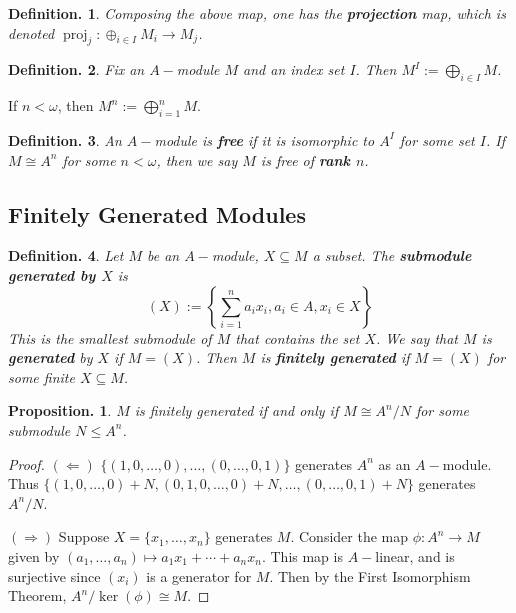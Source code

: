\documentclass[11pt, a4paper]{memoir}
\theoremstyle{change}
\newtheorem{proposition}[theorem]{Proposition.}
\theoremstyle{plain}
\theoremstyle{nonumberplain}
\newtheorem{definition}{Definition.}
\newtheorem{proof}{Proof}
\DeclareMathOperator{\proj}{proj}
\numberwithin{equation}{section}
\begin{document}
\begin{definition}
    Composing the above map, one has the \textbf{projection} map, which is denoted $\proj_j:\oplus_{i\in I}M_i\to M_j$.
\end{definition}
\begin{definition}
    Fix an $A-$module $M$ and an index set $I$.
    Then $M^I:=\bigoplus_{i\in I}M$.
\end{definition}
If $n<\omega$, then $M^n:=\bigoplus_{i=1}^n M$.
\begin{definition}
    An $A-$module is \textbf{free} if it is isomorphic to $A^I$ for some set $I$.
    If $M\cong A^n$ for some $n<\omega$, then we say $M$ is free of \textbf{rank $n$}.
\end{definition}
\subsection{Finitely Generated Modules}
\begin{definition}
    Let $M$ be an $A-$module, $X\subseteq M$ a subset.
    The \textbf{submodule generated by $X$} is
    \begin{equation*}
        (X):=\left\{\sum\limits_{i=1}^n a_ix_i,a_i\in A,x_i\in X\right\}
    \end{equation*}
    This is the smallest submodule of $M$ that contains the set $X$.
    We say that $M$ is \textbf{generated} by $X$ if $M=(X)$.
    Then $M$ is \textbf{finitely generated} if $M=(X)$ for some finite $X\subseteq M$.
\end{definition}
\begin{proposition}
    $M$ is finitely generated if and only if $M\cong A^n/N$ for some submodule $N\leq A^n$.
\end{proposition}
\begin{proof}
    $(\Leftarrow)$ $\{(1,0,\ldots,0),\ldots,(0,\ldots,0,1)\}$ generates $A^n$ as an $A-$module.
    Thus $\{(1,0,\ldots,0)+N,(0,1,0,\ldots,0)+N,\ldots,(0,\ldots,0,1)+N\}$ generates $A^n/N$.

    $(\Rightarrow)$ Suppose $X=\{x_1,\ldots,x_n\}$ generates $M$.
    Consider the map $\phi:A^n\to M$ given by $(a_1,\ldots,a_n)\mapsto a_1x_1+\cdots+a_nx_n$.
    This map is $A-$linear, and is surjective since $(x_i)$ is a generator for $M$.
    Then by the First Isomorphism Theorem, $A^n/\ker(\phi)\cong M$.
\end{proof}
\end{document}
